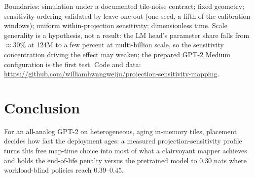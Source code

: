 \documentclass[journal]{IEEEtran}
\begin{document}
Boundaries: simulation under a documented tile-noise contract; fixed
geometry; sensitivity ordering validated by leave-one-out (one seed, a
fifth of the calibration windows); uniform within-projection
sensitivity; dimensionless time. Scale
generality is a hypothesis, not a result: the LM head's parameter share
falls from ${\approx}30\%$ at 124M to a few percent at multi-billion
scale, so the sensitivity concentration driving the effect may weaken;
the prepared GPT-2 Medium configuration is the first test.
Code and data:
\url{https://github.com/williamhwangweiju/projection-sensitivity-mapping}.

\section{Conclusion}
For an all-analog GPT-2 on heterogeneous, aging in-memory tiles,
placement decides how fast the deployment ages: a measured
projection-sensitivity profile turns this free map-time choice into
most of what a clairvoyant mapper achieves and holds the end-of-life
penalty versus the pretrained model to $0.30$ nats where workload-blind
policies reach $0.39$--$0.45$.

\end{document}
